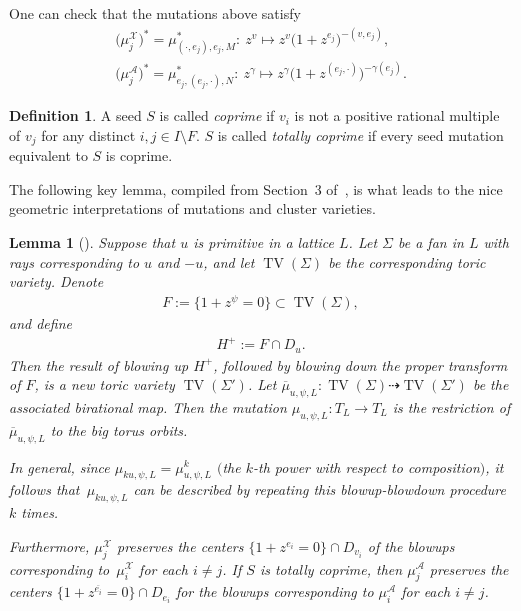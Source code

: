 \documentclass[pdftex]{sigma}
\numberwithin{equation}{section}
\numberwithin{figure}{section}
\numberwithin{table}{section}
\DeclareMathOperator{\TV}{TV}
\let\?=\overline
\let\rar=\rightarrow
\let\s=\mathcal
\newtheorem{lem}[thm]{Lemma}
\theoremstyle{definition}
\newtheorem{dfn}[thm]{Definition}
\begin{document}
One can check that the mutations above satisfy
\begin{gather*}%
	\big(\mu_j^{\s{X}}\big)^*=\mu_{(\cdot,e_j),e_j,M}^*\colon \ z^{v} \mapsto z^{v}\big(1+z^{e_j}\big)^{-(v,e_j)},\\
	\big(\mu_j^{\s{A}}\big)^*=\mu_{e_j,( e_j,\cdot ),N}^*\colon \ z^{\gamma} \mapsto z^{\gamma}\big(1+z^{( e_j,\cdot)}\big)^{-\gamma(e_j)}.
\end{gather*}

\begin{dfn}\label{coprime}A seed $S$ is called {\it coprime} if $v_i$ is not a positive rational multiple of $v_j$ for any distinct $i,j \in I\setminus F$. $S$ is called {\it totally coprime} if every seed mutation equivalent to $S$ is coprime.
\end{dfn}

The following key lemma, compiled from Section~3 of~\cite{GHK3}, is what leads to the nice geometric interpretations of mutations and cluster varieties.

\begin{lem}[\cite{GHK3}]\label{mugeom}Suppose that $u$ is primitive in a lattice $L$. Let $\Sigma$ be a fan in $L$ with rays corresponding to $u$ and $-u$, and let $\TV(\Sigma)$ be the corresponding toric variety. Denote
\begin{gather*}
 F:=\big\{1+z^{\psi}=0\big\}\subset \TV(\Sigma),
\end{gather*}
and define
\begin{gather*}
H^+:=F\cap D_{u}.
\end{gather*}
Then the result of blowing up $H^+$, followed by blowing down the proper transform of $F$, is a new toric variety $\TV(\Sigma')$. Let $\?{\mu}_{u,\psi,L}\colon \TV(\Sigma)\dashrightarrow \TV(\Sigma')$ be the associated birational map. Then the mutation $\mu_{u,\psi,L}\colon T_L\rar T_L$ is the restriction of $\?{\mu}_{u,\psi,L}$ to the big torus orbits.

In general, since $\mu_{ku,\psi,L}=\mu_{u,\psi,L}^k$ $($the $k$-th power with respect to composition$)$, it follows that~$\mu_{ku,\psi,L}$ can be described by repeating this blowup-blowdown procedure $k$ times.

Furthermore, $\mu_j^{\s{X}}$ preserves the centers $\big\{1+z^{e_i}=0\big\}\cap D_{v_i}$ of the blowups corresponding to~$\mu_i^{\s{X}}$ for each $i \neq j$. If $S$ is totally coprime, then $\mu_j^{\s{A}}$ preserves the centers $\big\{1+z^{\?{e_i}}=0\big\}\cap D_{e_i}$ for the blowups corresponding to $\mu_i^{\s{A}}$ for each $i \neq j$.
\end{lem}
\end{document}
